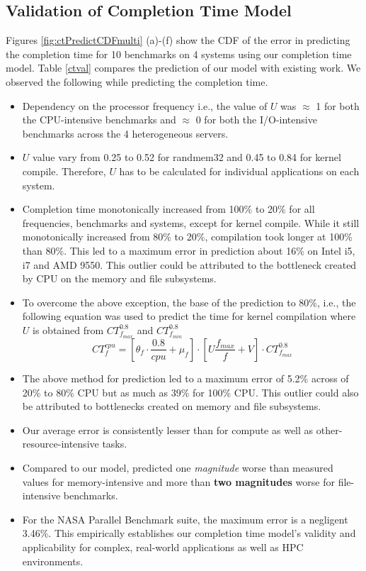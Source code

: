 \documentclass{sig-alternate}
\begin{document}
 \subsection{Validation of Completion Time Model} 
 \label{valCT}
Figures \ref{fig:ctPredictCDFmulti} (a)-(f) show the CDF of the error in predicting the completion time for 10 benchmarks on 4 systems using our completion time model. Table \ref{ctval} compares the prediction of our model  with  existing work. We observed the following while predicting the completion time. 
\begin{itemize}
 \item Dependency on the processor frequency i.e., the value of $U$ was $\approx$ 1 for both the CPU-intensive benchmarks and $\approx$ 0 for both the I/O-intensive benchmarks across the 4 heterogeneous servers.
 \item $U$ value vary from 0.25 to 0.52 for randmem32 and 0.45 to 0.84 for kernel compile. Therefore, $U$ has to be calculated for individual applications on each system. 
\item Completion time monotonically increased from 100\% to 20\% for all frequencies, benchmarks and systems, except for kernel compile. While it still monotonically increased from 80\% to 20\%, compilation took longer at 100\% than 80\%. This led to a maximum error in prediction about 16\% on Intel i5, i7 and AMD 9550. This outlier could be attributed to the bottleneck created by CPU on the memory and file subsystems.
 \item To overcome the above exception, the base of the prediction to 80\%, i.e., the following equation was used to predict the time for kernel compilation where $U$ is obtained from $CT^{0.8}_{f_{max}}$ and $CT^{0.8}_{f_{min}}$
 $$ CT^{cpu}_{f} = [ \theta _{f}\cdot \frac{0.8}{cpu} + \mu _{f} ] \cdot [ U \frac{f_{max}}{f} + V ] \cdot CT^{0.8}_{f_{max}}$$
 \item The above method for prediction led to a maximum error of 5.2\% across of 20\% to 80\% CPU but as much as 39\% for 100\% CPU. This outlier could also be attributed to bottlenecks created on memory and file subsystems.
\item Our average error is consistently lesser than \cite{Petrucci2011} for compute as well as other-resource-intensive tasks. 
 \item Compared to our model, \cite{Petrucci2011} predicted one \emph{magnitude} worse than measured values for memory-intensive and more than \textbf{two magnitudes} worse for file-intensive benchmarks.
 \item For the NASA Parallel Benchmark suite, the maximum error is a negligent 3.46\%. This empirically establishes our completion time model's validity and applicability for complex, real-world applications as well as HPC environments.
\end{itemize}
\end{document}
